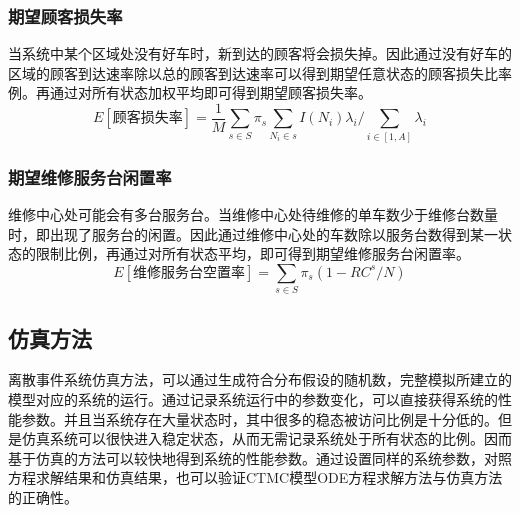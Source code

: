 \documentclass{article}
\begin{document}
\subsubsection{期望顾客损失率}
当系统中某个区域处没有好车时，新到达的顾客将会损失掉。因此通过没有好车的区域的顾客到达速率除以总的顾客到达速率可以得到期望任意状态的顾客损失比率例。再通过对所有状态加权平均即可得到期望顾客损失率。
\begin{equation}
E[\mbox{顾客损失率}] = \frac{1}{M} \sum \limits _{s \in S} \pi_{s} \sum \limits _{N_i \in s} I(N_i) \lambda_i / \sum \limits _{i \in [1,A]} \lambda_i 
\end{equation}

\subsubsection{期望维修服务台闲置率}
维修中心处可能会有多台服务台。当维修中心处待维修的单车数少于维修台数量时，即出现了服务台的闲置。因此通过维修中心处的车数除以服务台数得到某一状态的限制比例，再通过对所有状态平均，即可得到期望维修服务台闲置率。
\begin{equation}
E[\mbox{维修服务台空置率}] = \sum \limits _{s \in S} \pi_{s} (1 - RC^s / N)
\end{equation}


\subsection{仿真方法}
离散事件系统仿真方法，可以通过生成符合分布假设的随机数，完整模拟所建立的模型对应的系统的运行。通过记录系统运行中的参数变化，可以直接获得系统的性能参数。并且当系统存在大量状态时，其中很多的稳态被访问比例是十分低的。但是仿真系统可以很快进入稳定状态，从而无需记录系统处于所有状态的比例。因而基于仿真的方法可以较快地得到系统的性能参数。通过设置同样的系统参数，对照方程求解结果和仿真结果，也可以验证CTMC模型ODE方程求解方法与仿真方法的正确性。
\end{document}
